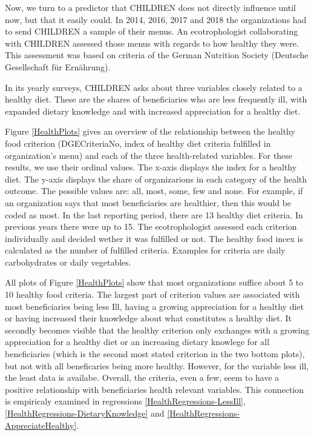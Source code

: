 \documentclass[12pt, a4paper, titlepage]{article}\usepackage[]{graphicx}\usepackage[]{color}
\begin{document}
Now, we turn to a predictor that CHILDREN does not directly influence until now, but that it easily could. In 2014, 2016, 2017 and 2018 the organizations had to send CHILDREN a sample of their menus. An ecotrophologist collaborating with CHILDREN assessed those menus with regards to how healthy they were. This assessment was based on criteria of the German Nutrition Society (Deutsche Gesellschaft für Ernährung). 

In its yearly surveys, CHILDREN asks about three variables closely related to a healthy diet. These are the shares of beneficiaries who are less frequently ill, with expanded dietary knowledge and with increased appreciation for a healthy diet. 

Figure \ref{HealthPlots} gives an overview of the relationship between the healthy food criterion (DGECriteriaNo, index of healthy diet criteria fulfilled in organization's menu) and each of the three health-related variables. For these results, we use their ordinal values. The x-axis displays the index for a healthy diet. The y-axis displays the share of organizarions in each category of the health outcome. The possible values are: all, most, some, few and none. For example, if an organization says that most beneficiaries are healthier, then this would be coded as most. In the last reporting period, there are 13 healthy diet criteria. In previous years there were up to 15. The ecotrophologist assessed each criterion individually and decided wether it was fulfilled or not. The healthy food incex is calculated as the number of fulfilled criteria. Examples for criteria are daily carbohydrates or daily vegetables.  

All plots of Figure \ref{HealthPlots} show that most organizations suffice about 5 to 10 healthy food criteria. The largest part of criterion values are associated with most beneficiaries being less Ill, having a growing appreciation for a healthy diet or having increased their knowledge about what constitutes a healthy diet. It secondly becomes visible that the healthy criterion only exchanges with a growing appreciation for a healthy diet or an increasing dietary knowlege for all beneficiaries (which is the second most stated criterion in the two bottom plots), but not with all beneficaries being more healthy. However, for the variable less ill, the least data is availabe. Overall, the criteria, even a few, seem to have a positive relationship with beneficiaries health relevant variables. This connection is empiricaly examined in regressions \ref{HealthRegressions-LessIll}, \ref{HealthRegressions-DietaryKnowledge} and \ref{HealthRegressions-AppreciateHealthy}.
\end{document}
